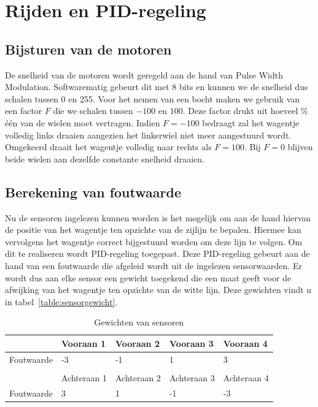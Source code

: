 \section{Rijden en PID-regeling}
\subsection{Bijsturen van de motoren}
De snelheid van de motoren wordt geregeld aan de hand van Pulse Width Modulation. Softwarematig gebeurt dit met 8 bits en kunnen we de snelheid dus schalen tussen 0 en 255. Voor het nemen van een bocht maken we gebruik van een factor $F$ die we schalen tussen $-100$ en $100$. Deze factor drukt uit hoeveel \% \'e\'en van de wielen moet vertragen. Indien $F=-100$ bedraagt zal het wagentje volledig links draaien aangezien het linkerwiel niet meer aangestuurd wordt. Omgekeerd draait het wagentje volledig naar rechts als $F = 100$. Bij $F=0$ blijven beide wielen aan dezelfde constante snelheid draaien.
\subsection{Berekening van foutwaarde}
Nu de sensoren ingelezen kunnen worden is het mogelijk om aan de hand hiervan de positie van het wagentje ten opzichte van de zijlijn te bepalen.
Hiermee kan vervolgens het wagentje correct bijgestuurd worden om deze lijn te volgen. Om dit te realiseren wordt PID-regeling toegepast.
Deze PID-regeling gebeurt aan de hand van een foutwaarde die afgeleid wordt uit de ingelezen sensorwaarden. Er wordt dus aan elke sensor een gewicht toegekend die een maat geeft voor de afwijking van het wagentje ten opzichte van de witte lijn. Deze gewichten vindt u in tabel~\vref{table:sensorgewicht}.

\begin{table}[H]
	\centering
	\begin{tabular}{lllll}
		\hline
		\multicolumn{1}{|l|}{}           & \multicolumn{1}{l|}{Vooraan 1}   & \multicolumn{1}{l|}{Vooraan 2}   & \multicolumn{1}{l|}{Vooraan 3}   & \multicolumn{1}{l|}{Vooraan 4}   \\ \hline
		\multicolumn{1}{|l|}{Foutwaarde} & \multicolumn{1}{l|}{-3}          & \multicolumn{1}{l|}{-1}          & \multicolumn{1}{l|}{1}           & \multicolumn{1}{l|}{3}           \\ \hline
		&                                  &                                  &                                  &                                  \\ \hline
		\multicolumn{1}{|l|}{}           & \multicolumn{1}{l|}{Achteraan 1} & \multicolumn{1}{l|}{Achteraan 2} & \multicolumn{1}{l|}{Achteraan 3} & \multicolumn{1}{l|}{Achteraan 4} \\ \hline
		\multicolumn{1}{|l|}{Foutwaarde} & \multicolumn{1}{l|}{3}           & \multicolumn{1}{l|}{1}           & \multicolumn{1}{l|}{-1}          & \multicolumn{1}{l|}{-3}           \\ \hline
	\end{tabular}
	\caption{Gewichten van sensoren}
	\label{table:sensorgewicht}
\end{table}

